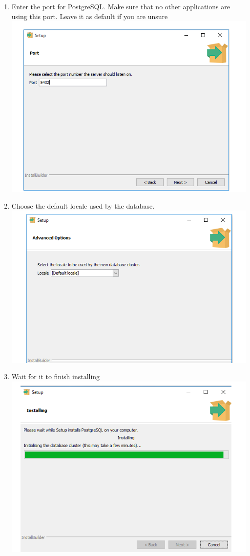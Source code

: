 \documentclass[a4paper,12pt]{article}
\begin{document}
\begin{enumerate}
\item Enter the port for PostgreSQL. Make sure that no other applications are using this port. Leave it as default if you are unsure \\ 
\includegraphics[width=0.9\linewidth, center]{./Installation/postGresql3.PNG}\\[0.4cm]
\item Choose the default locale used by the database. \\ 
\includegraphics[width=0.9\linewidth, center]{./Installation/postGresql4.PNG}\\[0.4cm]
\item Wait for it to finish installing \\ 
\includegraphics[width=0.9\linewidth, center]{./Installation/postGresql5.PNG}\\[0.4cm] 

\end{enumerate}
\end{document}
